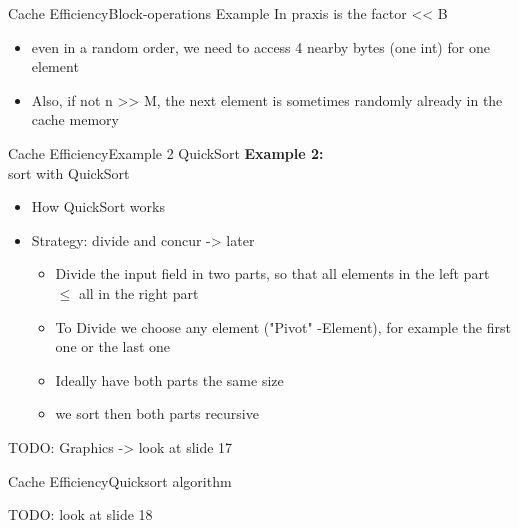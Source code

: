 
\begin{frame}{Cache Efficiency}{Block-operations Example}
	In praxis is the factor << B 
	\begin{itemize}
		\item
			even in a random order, we need to access 4 nearby bytes (one int) for 
			one element
		\item
			Also, if not n >> M, the next element is sometimes randomly already in  
			the cache memory
	\end{itemize}
\end{frame}


\begin{frame}{Cache Efficiency}{Example 2 QuickSort}
	\textbf{Example 2:}\\
	sort with QuickSort
	\begin{itemize}
		\item
			How QuickSort works
		\item
			Strategy: divide and concur -> later
		\begin{itemize}
			\item
				Divide the input field in two parts, so that all elements in the left 
				part $\leq$ all in the right part
			\item
				To Divide we choose any element ("Pivot" -Element), for example the 
				first one or the last one
			\item
				Ideally have both parts the same size
			\item
				we sort then both parts recursive
		\end{itemize}
	\end{itemize}
	
	TODO: Graphics -> look at slide 17 \vspace{2em}
	
\end{frame}


\begin{frame}{Cache Efficiency}{Quicksort algorithm}
	
	TODO: look at slide 18 \vspace{2em}
	
\end{frame}

